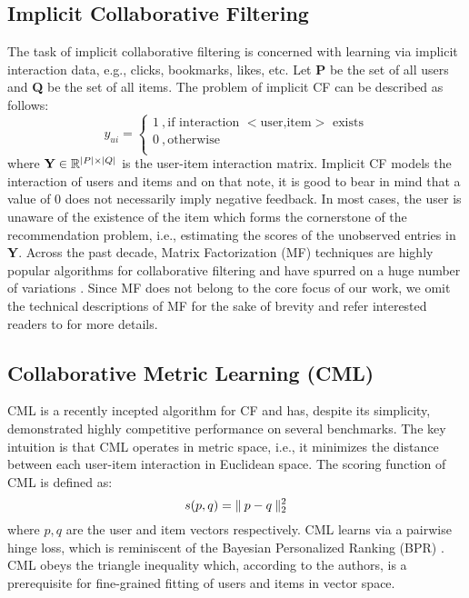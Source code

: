 \documentclass[sigconf]{acmart}
\DeclarePairedDelimiter{\abs}{\lvert}{\rvert}
\DeclarePairedDelimiter\norm{\lVert}{\rVert}
\begin{document}
\subsection{Implicit Collaborative Filtering}
The task of implicit collaborative filtering is concerned with learning via implicit interaction data, e.g., clicks, bookmarks, likes, etc. Let \textbf{P} be the set of all users and \textbf{Q} be the set of all items. The problem of implicit CF can be described as follows:
\begin{equation}
y_{ui} =
\begin{cases}
1 \:, \text{if interaction $<$user,item$>$ exists} \\
0 \: , \text{otherwise}\\
\end{cases}
 \end{equation}
where $\textbf{Y} \in \mathbb{R}^{\abs{P} \times \abs{Q}}$ is the user-item interaction matrix. Implicit CF models the interaction of users and items and on that note, it is good to bear in mind that a value of $0$ does not necessarily imply negative feedback. In most cases, the user is unaware of the existence of the item which forms the cornerstone of the recommendation problem, i.e., estimating the scores of the unobserved entries in \textbf{Y}. Across the past decade, Matrix Factorization (MF) techniques are highly popular algorithms for collaborative filtering and have spurred on a huge number of variations \cite{He:2017:NCF:3038912.3052569,DBLP:conf/sigir/HeZKC16}. Since MF does not belong to the core focus of our work, we omit the technical descriptions of MF for the sake of brevity and refer interested readers to \cite{He:2017:NCF:3038912.3052569,DBLP:conf/www/HsiehYCLBE17} for more details. 

\subsection{Collaborative Metric Learning (CML)}
\label{sec:cml}
CML \cite{DBLP:conf/www/HsiehYCLBE17} is a recently incepted algorithm for CF and has, despite its simplicity, demonstrated highly competitive performance on several benchmarks. The key intuition is that CML operates in metric space, i.e., it minimizes the distance between each user-item interaction in Euclidean space. The scoring function of CML is defined as:
\begin{equation}
s(p,q) = \norm{\:p-q\:}^{2}_{2}
\end{equation}
where $p,q$ are the user and item vectors respectively. CML learns via a pairwise hinge loss, which is reminiscent of the Bayesian Personalized Ranking (BPR) \cite{DBLP:conf/uai/RendleFGS09}. CML obeys the triangle inequality which, according to the authors, is a prerequisite for fine-grained fitting of users and items in vector space. 
\end{document}
